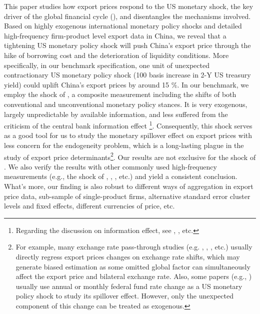 This paper studies how export prices respond to the US monetary shock, the key driver of the global financial cycle (\cite{miranda2020us}), and disentangles the mechanisms involved. Based on highly exogenous international monetary policy shocks and detailed high-frequency firm-product level export data in China, we reveal that a tightening US monetary policy shock will push China's export price through the hike of borrowing cost and the deterioration of liquidity conditions. More specifically, in our benchmark specification, one unit of unexpected contractionary US monetary policy shock (100 basis increase in 2-Y US treasury yield) could uplift China's export prices by around 15 $\%$. In our benchmark, we employ the shock of \cite{bu2021unified}, a composite measurement including the shifts of both conventional and unconventional monetary policy stances. It is very exogenous, largely unpredictable by available information, and less suffered from the criticism of the central bank information effect \footnote{Regarding the discussion on information effect, see \cite{nakamura2018high}, \cite{jarocinski2020deconstructing}, etc.}. Consequently, this shock serves as a good tool for us to study the monetary spillover effect on export prices with less concern for the endogeneity problem, which is a long-lasting plague in the study of export price determinants\footnote{For example, many exchange rate pass-through studies (e.g. \cite{gopinath2010currency}, \cite{gopinath2014handbook}, \cite{gopinath2020dominant}, etc.) usually directly regress export prices changes on exchange rate shifts, which may generate biased estimation as some omitted global factor can simultaneously affect the export price and bilateral exchange rate. Also, some papers (e.g., \cite{lin2018international}) usually use annual or monthly federal fund rate change as a US monetary policy shock to study its spillover effect. However, only the unexpected component of this change can be treated as exogenous.}. Our results are not exclusive for the shock of \cite{bu2021unified}. We also verify the results with other commonly used high-frequency measurements (e.g., the shock of \cite{guraynak2005actions}, \cite{nakamura2018high}, \cite{jarocinski2020deconstructing}, etc.) and yield a consistent conclusion. What's more, our finding is also robust to different ways of aggregation in export price data, sub-sample of single-product firms, alternative standard error cluster levels and fixed effects, different currencies of price, etc. 

